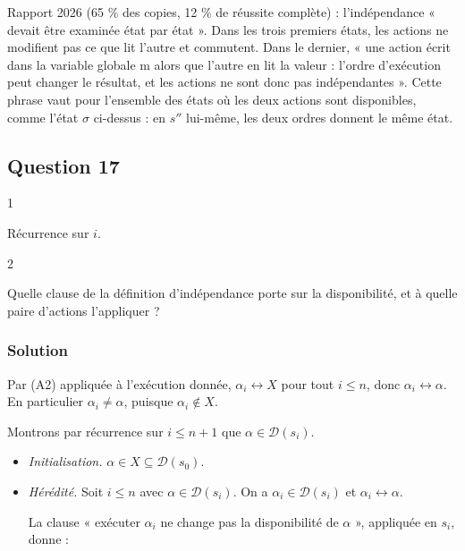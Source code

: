 \documentclass[11pt,a4paper]{article}
\begin{document}
\begin{jury}

Rapport 2026 (65 \% des copies, 12 \% de réussite complète) : l'indépendance « devait être examinée état par état ». Dans les trois premiers états, les actions ne modifient pas ce que lit l'autre et commutent. Dans le dernier, « une action écrit dans la variable globale m alors que l'autre en lit la valeur : l'ordre d'exécution peut changer le résultat, et les actions ne sont donc pas indépendantes ». Cette phrase vaut pour l'ensemble des états où les deux actions sont disponibles, comme l'état \(\sigma\) ci-dessus : en \(s''\) lui-même, les deux ordres donnent le même état.

\end{jury}

\hypertarget{question-17}{%
\subsection{Question 17}\label{question-17}}

\begin{indication}{1}

Récurrence sur \(i\).

\end{indication}

\begin{indication}{2}

Quelle clause de la définition d'indépendance porte sur la disponibilité, et à quelle paire d'actions l'appliquer ?

\end{indication}

\hypertarget{solution-16}{%
\subsubsection{Solution}\label{solution-16}}

Par (A2) appliquée à l'exécution donnée, \(\alpha_i\leftrightarrow X\) pour tout \(i\le n\), donc \(\alpha_i\leftrightarrow\alpha\). En particulier \(\alpha_i\neq\alpha\), puisque \(\alpha_i\notin X\).

Montrons par récurrence sur \(i\le n+1\) que \(\alpha\in\mathcal D(s_i)\).

\begin{itemize}
\item
  \emph{Initialisation.} \(\alpha\in X\subseteq\mathcal D(s_0)\).
\item
  \emph{Hérédité.} Soit \(i\le n\) avec \(\alpha\in\mathcal D(s_i)\). On a \(\alpha_i\in\mathcal D(s_i)\) et \(\alpha_i\leftrightarrow\alpha\).

  La clause « exécuter \(\alpha_i\) ne change pas la disponibilité de \(\alpha\) », appliquée en \(s_i\), donne :
\end{itemize}
\end{document}

